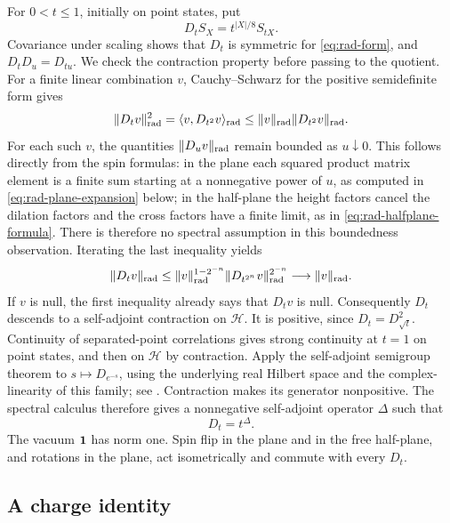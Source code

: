 For $0<t\leq1$, initially on point states, put
\begin{equation}
       D_t S_X=t^{|X|/8}S_{tX}.
 \label{eq:rad-dilation}
\end{equation}
Covariance under scaling shows that $D_t$ is symmetric for
\eqref{eq:rad-form}, and $D_tD_u=D_{tu}$.  We check the contraction
property before passing to the quotient.  For a finite linear
combination $v$, Cauchy--Schwarz for the positive semidefinite form gives
\[
 \|D_t v\|_{\rm rad}^{2}
   =\langle v,D_{t^2}v\rangle_{\rm rad}
   \leq\|v\|_{\rm rad}\|D_{t^2}v\|_{\rm rad}.
\]
For each such $v$, the quantities $\|D_u v\|_{\rm rad}$ remain bounded
as $u\downarrow0$.  This follows directly from the spin formulas: in
the plane each squared product matrix element is a finite sum starting
at a nonnegative power of $u$, as computed in
\eqref{eq:rad-plane-expansion} below; in the half-plane the height
factors cancel the dilation factors and the cross factors have a
finite limit, as in \eqref{eq:rad-halfplane-formula}.  There is therefore
no spectral assumption in this boundedness observation.  Iterating the
last inequality yields
\[
 \|D_t v\|_{\rm rad}
 \leq \|v\|_{\rm rad}^{1-2^{-n}}
       \|D_{t^{2^n}}v\|_{\rm rad}^{2^{-n}}
 \longrightarrow \|v\|_{\rm rad}.
\]
If $v$ is null, the first inequality already says that $D_t v$ is null.
Consequently $D_t$ descends to a self-adjoint contraction on
$\mathcal H$.  It is positive, since
$D_t=D_{\sqrt t}^{2}$.  Continuity of separated-point correlations
gives strong continuity at $t=1$ on point states, and then on
$\mathcal H$ by contraction. Apply the self-adjoint semigroup theorem to
$s\mapsto D_{e^{-s}}$, using the underlying real Hilbert space and the
complex-linearity of this family; see
\cite[Theorem~7.3.10 and (7.3.9)]{BuehlerSalamon2016}.
Contraction makes its generator nonpositive. The spectral calculus
\cite[Theorem~6.4.1 and Section~6.5]{BuehlerSalamon2016} therefore gives
a nonnegative self-adjoint operator $\Delta$ such that
\begin{equation}
                     D_t=t^\Delta.
 \label{eq:rad-generator}
\end{equation}
The vacuum $\mathbf 1$ has norm one.  Spin flip in the plane and in the free
half-plane, and rotations in the plane, act isometrically and commute
with every $D_t$.

\subsection{A charge identity}

